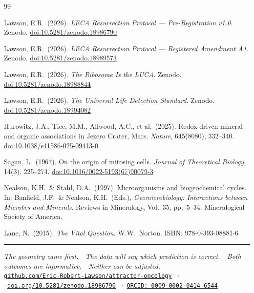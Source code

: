\documentclass[11pt, a4paper]{article}
\begin{document}
\begin{thebibliography}{99}

Lawson, E.R.\ (2026).
\textit{LECA Resurrection Protocol ---
Pre-Registration v1.0}.
Zenodo.
\href{https://doi.org/10.5281/zenodo.18986790}
{doi:10.5281/zenodo.18986790}

Lawson, E.R.\ (2026).
\textit{LECA Resurrection Protocol ---
Registered Amendment A1}.
Zenodo.
\href{https://doi.org/10.5281/zenodo.18989573}
{doi:10.5281/zenodo.18989573}

Lawson, E.R.\ (2026).
\textit{The Ribosome Is the LUCA}.
Zenodo.
\href{https://doi.org/10.5281/zenodo.18988844}
{doi:10.5281/zenodo.18988844}

Lawson, E.R.\ (2026).
\textit{The Universal Life Detection Standard}.
Zenodo.
\href{https://doi.org/10.5281/zenodo.18994082}
{doi:10.5281/zenodo.18994082}

Hurowitz, J.A., Tice, M.M., Allwood, A.C.,
et al.\ (2025).
Redox-driven mineral and organic associations
in Jezero Crater, Mars.
\textit{Nature}, 645(8080), 332--340.
\href{https://doi.org/10.1038/s41586-025-09413-0}
{doi:10.1038/s41586-025-09413-0}

Sagan, L.\ (1967).
On the origin of mitosing cells.
\textit{Journal of Theoretical Biology},
14(3), 225--274.
\href{https://doi.org/10.1016/0022-5193(67)90079-3}
{doi:10.1016/0022-5193(67)90079-3}

Nealson, K.H.\ \& Stahl, D.A.\ (1997).
Microorganisms and biogeochemical cycles.
In: Banfield, J.F.\ \& Nealson, K.H.\ (Eds.),
\textit{Geomicrobiology: Interactions between
Microbes and Minerals}.
Reviews in Mineralogy, Vol.\ 35, pp.\ 5--34.
Mineralogical Society of America.

Lane, N.\ (2015).
\textit{The Vital Question}.
W.W.\ Norton.
ISBN: 978-0-393-08881-6

\end{thebibliography}

\vspace{1em}
\noindent\textcolor{rulecolor}{\rule{\linewidth}{0.4pt}}
\begin{center}
\footnotesize
\textit{The geometry came first.\ \
The data will say which prediction is correct.\ \
Both outcomes are informative.\ \
Neither can be adjusted.}\\[0.15em]
\href{https://github.com/Eric-Robert-Lawson/attractor-oncology}
{\texttt{github.com/Eric-Robert-Lawson/attractor-oncology}}
\ $\cdot$\
\href{https://doi.org/10.5281/zenodo.18986790}
{\texttt{doi.org/10.5281/zenodo.18986790}}
\ $\cdot$\
\href{https://orcid.org/0009-0002-0414-6544}
{\texttt{ORCID: 0009-0002-0414-6544}}
\end{center}
\end{document}
